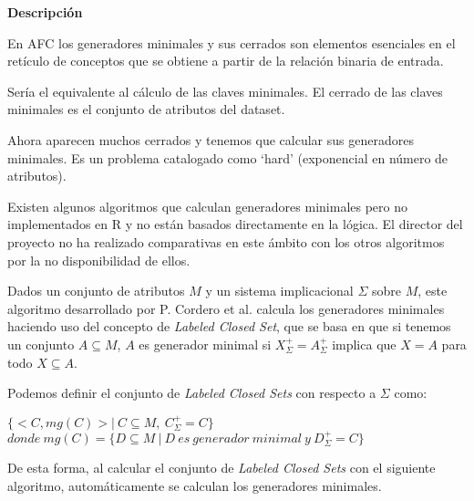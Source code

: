 \textbf{Descripci\'on} 

En AFC los generadores minimales y sus cerrados son elementos esenciales en el ret\'iculo de conceptos  que se obtiene a partir de la relaci\'on binaria de entrada. 

Ser\'ia el equivalente al c\'alculo de las claves minimales. El cerrado de las claves minimales es el conjunto de atributos del dataset. 

Ahora aparecen muchos cerrados y tenemos que calcular sus generadores minimales. Es un problema catalogado como \enquote*{hard} (exponencial en n\'umero de atributos).

Existen algunos algoritmos que  calculan generadores minimales pero no implementados en R y no est\'an basados directamente en la l\'ogica. El director del proyecto no ha realizado comparativas en este \'ambito con los otros algoritmos por la no disponibilidad de ellos.



Dados un conjunto de atributos \(M\) y un sistema implicacional \(\Sigma\) sobre \(M\), este algoritmo desarrollado por P. Cordero et al. \cite{LCS} calcula los generadores minimales haciendo uso del concepto de \textit{Labeled Closed Set}, que se basa en que si tenemos un conjunto \(A \subseteq M\), \(A\) es generador minimal si \(X^+_{\Sigma} = A^+_{\Sigma}\) implica que \(X = A\) para todo  \(X \subseteq A\). 

Podemos definir el conjunto de \textit{Labeled Closed Sets} con respecto a \(\Sigma\) como:
\begin{center}
    \(\{<C,mg(C)> | \ C \subseteq M, \ C^+_{\Sigma} = C \}\)\\
     \(donde \ mg(C) = \{D \subseteq M \ | \ D \ es \ generador \ minimal \ y \ D^+_{\Sigma} = C \}\)
\end{center}

De esta forma, al calcular el conjunto de \textit{Labeled Closed Sets} con el siguiente algoritmo, autom\'aticamente se calculan los generadores minimales.\\

